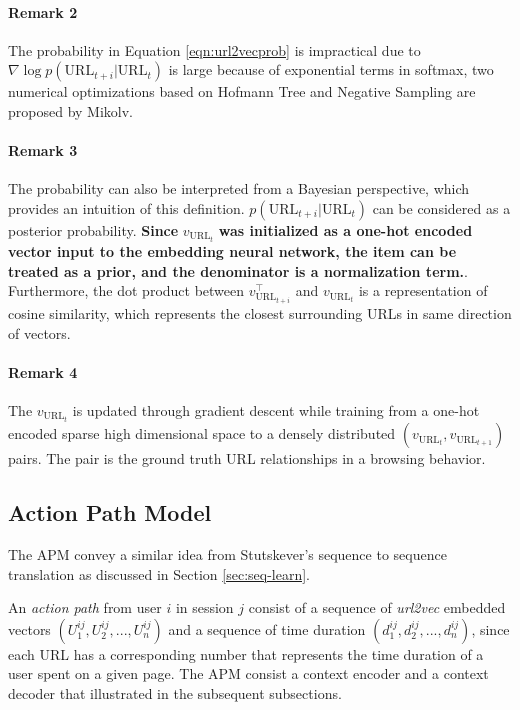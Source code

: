 \paragraph{Remark 2} The probability in Equation \ref{eqn:url2vecprob} is impractical due to
$\nabla \log{p(\text{URL}_{t+i} | \text{URL}_t)}$ is large because of exponential terms in softmax,
two numerical optimizations \cite{mikolv2013embedding} based on Hofmann Tree and Negative Sampling
are proposed by Mikolv.

\paragraph{Remark 3} The probability can also be interpreted from a Bayesian perspective,
which provides an intuition of this definition. $p(\text{URL}_{t+i} | \text{URL}_t)$
can be considered as a posterior probability. \textbf{Since} ${v_{\text{URL}_t}}$ \textbf{was initialized
as a one-hot encoded vector input to the embedding neural network, the item can be treated
as a prior, and the denominator is a normalization term.}.
Furthermore, the dot product between $v_{\text{URL}_{t+i}} ^\top$
and $v_{\text{URL}_t}$ is a representation of cosine similarity, which represents
the closest surrounding URLs in same direction of vectors.

\paragraph{Remark 4} The $v_{\text{URL}_t}$ is updated through gradient descent while training 
from a one-hot encoded sparse high dimensional space to a densely distributed
$(v_{\text{URL}_t}, v_{\text{URL}_{t+1}})$ pairs. 
The pair is the ground truth URL relationships in a browsing behavior.

\subsection{Action Path Model}

The APM convey a similar idea from Stutskever's sequence 
to sequence translation as discussed in Section \ref{sec:seq-learn}.

An \emph{action path} from user $i$ in session $j$ consist of 
a sequence of \emph{url2vec} embedded vectors $(U^{ij}_1, U^{ij}_2, ..., U^{ij}_n)$ 
and a sequence of time duration $(d^{ij}_1, d^{ij}_2, ..., d^{ij}_n)$, since each URL 
has a corresponding number that represents the time duration of a user spent on a given page.
The APM consist a context encoder and a context decoder that illustrated in the subsequent
subsections.

